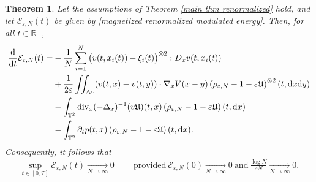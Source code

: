 \documentclass[11pt,reqno]{amsart}
\newtheorem{thm}{Theorem}[section]
\numberwithin{equation}{section}
\def\dd{{\rm d}}
\begin{document}
\begin{thm}
Let the assumptions of {\rm Theorem \ref{main thm renormalized}} hold, 
and let $\mathcal{E}_{\varepsilon,N}(t)$ be given by \eqref{magnetized renormalized modulated energy}. Then, for all $t\in \mathbb{R}_{+}$, 
\begin{align}
\frac{\dd}{\dd t}\mathcal{E}_{\varepsilon,N}(t)=& -\frac{1}{N}\sum_{i=1}^{N}\big(v(t,x_i(t))-\xi_i(t)\big)^{\otimes2}:D_xv(t,x_i(t))
\notag\\
&+\frac{1}{2\varepsilon}\iint_{\Delta^{c}}(v(t,x)-v(t,y))\cdot \nabla_{x} V(x-y)\left(\rho_{\varepsilon,N}-1-\varepsilon \mathfrak{U}\right)^{\otimes 2}(t,\dd x\dd y) \notag \notag\\
&-\int_{\mathbb{T}^{2}} \mathrm{div}_{x} (-\Delta_{x})^{-1}(v\mathfrak{U})(t,x)\left(\rho_{\varepsilon,N}-1-\varepsilon\mathfrak{U}\right)(t,\dd x) \notag\\
&-\int_{\mathbb{T}^{2}}\partial_{t}p(t,x)\left(\rho_{\varepsilon,N}-1-\varepsilon\mathfrak{U}\right)(t,\dd x).  
\end{align}
Consequently, it follows that 
\begin{align*}
\underset{t\in [0,T]}{\sup}\mathcal{E}_{\varepsilon,N}(t)\underset{N\rightarrow \infty}{\longrightarrow}0\ \qquad 
\mbox{provided}\ \mathcal{E}_{\varepsilon,N}(0)\underset{N\rightarrow \infty}{\longrightarrow}0\ \mbox{and}\ \frac{\log N}{\varepsilon N}\underset{N\rightarrow \infty}{\longrightarrow} 0.  \end{align*}
\label{time derivative of modulated energy statement}
\end{thm}
\end{document}
